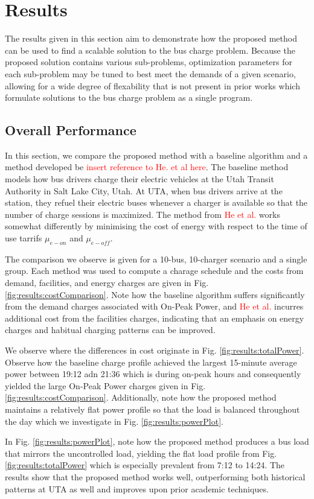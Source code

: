 \section{Results}
The results given in this section aim to demonstrate how the proposed method can be used to find a scalable solution to the bus charge problem. Because the proposed solution contains various sub-problems, optimization parameters for each sub-problem may be tuned to best meet the demands of a given scenario, allowing for a wide degree of flexability that is not present in prior works which formulate solutions to the bus charge problem as a single program.
\subsection{Overall Performance}
In this section, we compare the proposed method with a baseline algorithm and a method developed be \textcolor{red}{insert reference to He. et al here}. The baseline method models how bus drivers charge their electric vehicles at the Utah Transit Authority in Salt Lake City, Utah. At UTA, when bus drivers arrive at the station, they refuel their electric buses whenever a charger is available so that the number of charge sessions is maximized. The method from \textcolor{red}{He et al.} works somewhat differently by minimising the cost of energy with respect to the time of use tarrifs $\mu_{e-on}$ and $\mu_{e-off}$.
\par The comparison we observe is given for a 10-bus, 10-charger scenario and a single group. Each method was used to compute a charage schedule and the costs from demand, facilities, and energy charges are given in Fig. \ref{fig:results:costComparison}. Note how the baseline algorithm suffers significantly from the demand charges associated with On-Peak Power, and \textcolor{red}{He et al.} incurres additional cost from the facilities charges, indicating that an emphasis on energy charges and habitual charging patterns can be improved.
\par We observe where the differences in cost originate in Fig. \ref{fig:results:totalPower}. Observe how the baseline charge profile achieved the largest 15-minute average power between 19:12 adn 21:36 which is during on-peak hours and consequently yielded the large On-Peak Power charges given in Fig. \ref{fig:results:costComparison}. Additionally, note how the proposed method maintains a relatively flat power profile so that the load is balanced throughout the day which we investigate in Fig. \ref{fig:results:powerPlot}.
\par In Fig. \ref{fig:results:powerPlot}, note how the proposed method produces a bus load that mirrors the uncontrolled load, yielding the flat load profile from Fig. \ref{fig:results:totalPower} which is especially prevalent from 7:12 to 14:24. The results show that the proposed method works well, outperforming both historical patterns at UTA as well and improves upon prior academic techniques.
 


